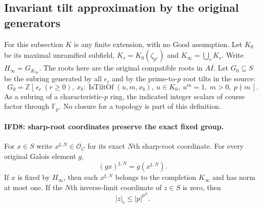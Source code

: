 \documentclass[11pt,a4paper]{article}
\numberwithin{equation}{section}
\theoremstyle{remark}\newtheorem{remark}[theorem]{Remark}
\begin{document}
\subsection{Invariant tilt approximation by the original generators}

For this subsection $K$ is any finite extension, with no
$\mathrm{Good}$ assumption. Let $K_0$ be its maximal unramified
subfield, $K_r=K_0(\zeta_{p^r})$ and
$K_\infty=\bigcup_rK_r$. Write $H_\infty=G_{K_\infty}$.
The roots here are the original compatible roots in $AI$.
Let $G_0\subseteq S$ be the subring generated by all $\epsilon_r$
and by the prime-to-$p$ root tilts in the source:
\[
 G_0=\mathbb Z[\,\epsilon_r\ (r\geq0),\ x_b:
  \operatorname{IsTiltOf}(u,m,x_b),\ u\in K_0,\ u^m=1,
                  \ m>0,\ p\nmid m\,].                    \tag{IFD.13}
\]
As a subring of a characteristic-$p$ ring, the indicated integer
scalars of course factor through $\mathbb F_p$.
No closure for a topology is part of this definition.

\paragraph{IFD8: sharp-root coordinates preserve the exact fixed group.}
\label{claim:IFD8}
For $x\in S$ write $x^{\sharp,N}\in\mathcal O_C$ for its exact
$N$th sharp-root coordinate. For every original Galois element $g$,
\[
        (g x)^{\sharp,N}=g(x^{\sharp,N}).                    \tag{IFD.14}
\]
If $x$ is fixed by $H_\infty$, then each $x^{\sharp,N}$ belongs
to the completion $\widehat{K_\infty}$ and has norm at most one.
If the $N$th inverse-limit coordinate of $z\in S$ is zero, then
\[
                            |z|_\flat\leq |p|^{p^N}.        \tag{IFD.15}
\]
\end{document}
